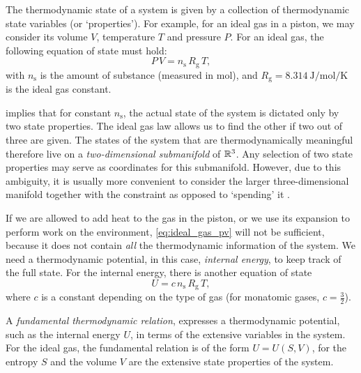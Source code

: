The thermodynamic state of a system is given by a collection of thermodynamic state variables (or `properties'). For example, for an ideal gas in a piston, we may consider its volume $V$, temperature $T$ and pressure $P$. For an ideal gas, the following equation of state must hold:
\begin{equation}
    P \, V = n_\text{s} \, R_\text{g} \, T,
    \label{eq:ideal_gas_pv}
\end{equation}
with $n_\text{s}$ is the amount of substance (measured in \si{\mole}), and $R_\text{g} = \SI{8.314}{\joule \per \mole \per \kelvin}$ is the ideal gas constant.  

 implies that for constant $n_\text{s}$, the actual state of the system is dictated only by two state properties. The ideal gas law allows us to find the other if two out of three are given. The states of the system that are thermodynamically meaningful therefore live on a \emph{two-dimensional submanifold} of $\mathbb{R}^3$. Any selection of two state properties may serve as coordinates for this submanifold. However, due to this ambiguity, it is usually more convenient to consider the larger three-dimensional manifold together with the constraint as opposed to `spending' it \cite{Balian2001, Giancoli2014}.

If we are allowed to add heat to the gas in the piston, or we use its expansion to perform work on the environment, \cref{eq:ideal_gas_pv} will not be sufficient, because it does not contain \emph{all} the thermodynamic information of the system. We need a thermodynamic potential, in this case, \emph{internal energy}, to keep track of the full state. For the internal energy, there is another equation of state \cite{Callen1985}
\begin{equation}
    U = c\, n_\text{s}\, R_\text{g}\, T,
    \label{eq:ideal_gas_U}
\end{equation}
where $c$ is a constant depending on the type of gas (for monatomic gases, $c = \tfrac{3}{2}$).

A \emph{fundamental thermodynamic relation}, expresses a thermodynamic potential, such as the internal energy $U$, in terms of the extensive variables in the system. For the ideal gas, the fundamental relation is of the form $U = U(S, V)$, for the entropy $S$ and the volume $V$ are the extensive state properties of the system. 

